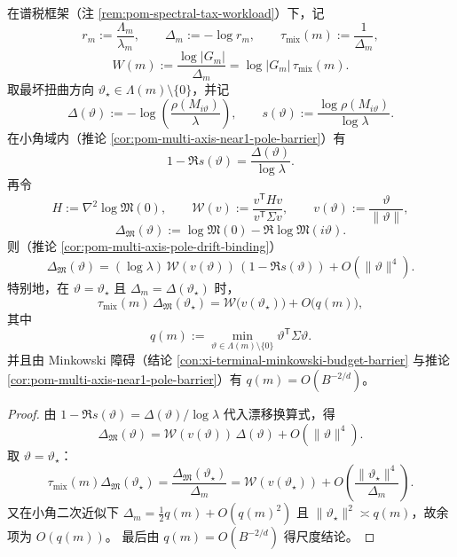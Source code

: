 \begin{theorem}\label{thm:xi-time-part9h-drift-mix-uncertainty}
在谱税框架（注 \ref{rem:pom-spectral-tax-workload}）下，记
\[
r_m:=\frac{\Lambda_m}{\lambda_m},\qquad
\Delta_m:=-\log r_m,\qquad
\tau_{\mathrm{mix}}(m):=\frac{1}{\Delta_m},
\]
\[
W(m):=\frac{\log|G_m|}{\Delta_m}
=\log|G_m|\,\tau_{\mathrm{mix}}(m).
\]
取最坏扭曲方向 \(\vartheta_\star\in\Lambda(m)\setminus\{0\}\)，并记
\[
\Delta(\vartheta):=-\log\!\left(\frac{\rho(M_{i\vartheta})}{\lambda}\right),\qquad
s(\vartheta):=\frac{\log\rho(M_{i\vartheta})}{\log\lambda}.
\]
在小角域内（推论 \ref{cor:pom-multi-axis-near1-pole-barrier}）有
\[
1-\Re s(\vartheta)=\frac{\Delta(\vartheta)}{\log\lambda}.
\]
再令
\[
H:=\nabla^2\log\mathfrak M(0),\qquad
\mathcal W(v):=\frac{v^{\mathsf T}Hv}{v^{\mathsf T}\Sigma v},\qquad
v(\vartheta):=\frac{\vartheta}{\|\vartheta\|},
\]
\[
\Delta_{\mathfrak M}(\vartheta):=
\log\mathfrak M(0)-\Re\log\mathfrak M(i\vartheta).
\]
则（推论 \ref{cor:pom-multi-axis-pole-drift-binding}）
\[
\Delta_{\mathfrak M}(\vartheta)
=(\log\lambda)\,\mathcal W(v(\vartheta))\,(1-\Re s(\vartheta))
+O(\|\vartheta\|^4).
\]
特别地，在 \(\vartheta=\vartheta_\star\) 且 \(\Delta_m=\Delta(\vartheta_\star)\) 时，
\[
\tau_{\mathrm{mix}}(m)\,\Delta_{\mathfrak M}(\vartheta_\star)
=
\mathcal W\!\bigl(v(\vartheta_\star)\bigr)
+O\!\bigl(q(m)\bigr),
\]
其中
\[
q(m):=\min_{\vartheta\in\Lambda(m)\setminus\{0\}}\vartheta^{\mathsf T}\Sigma\vartheta.
\]
并且由 Minkowski 障碍（结论 \ref{con:xi-terminal-minkowski-budget-barrier} 与推论 \ref{cor:pom-multi-axis-near1-pole-barrier}）有 \(q(m)=O(B^{-2/d})\)。
\end{theorem}
\begin{proof}
由
\(
1-\Re s(\vartheta)=\Delta(\vartheta)/\log\lambda
\)
代入漂移换算式，得
\[
\Delta_{\mathfrak M}(\vartheta)
=
\mathcal W(v(\vartheta))\,\Delta(\vartheta)+O(\|\vartheta\|^4).
\]
取 \(\vartheta=\vartheta_\star\)：
\[
\tau_{\mathrm{mix}}(m)\Delta_{\mathfrak M}(\vartheta_\star)
=
\frac{\Delta_{\mathfrak M}(\vartheta_\star)}{\Delta_m}
=
\mathcal W(v(\vartheta_\star))
+O\!\left(\frac{\|\vartheta_\star\|^4}{\Delta_m}\right).
\]
又在小角二次近似下
\(
\Delta_m=\tfrac12 q(m)+O(q(m)^2)
\)
且 \(\|\vartheta_\star\|^2\asymp q(m)\)，故余项为 \(O(q(m))\)。
最后由 \(q(m)=O(B^{-2/d})\) 得尺度结论。
\end{proof}

